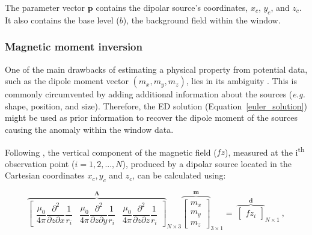     The parameter vector $\mathbf{p}$ contains the dipolar source's coordinates, $x_c$, $y_c$, and $z_c$. It also contains the base level ($b$), the background field within the window.
    
\subsubsection{Magnetic moment inversion}

    One of the main drawbacks of estimating a physical property from potential data, such as the dipole moment vector $(m_x, m_y, m_z)$, lies in its ambiguity \citep{Blakely1996}. This is commonly circumvented by adding additional information about the sources (\textit{e.g.} shape, position, and size). Therefore, the ED solution (Equation~\ref{euler_solution}) might be used as prior information to recover the dipole moment of the sources causing the anomaly within the window data.
    
     Following \citet{Oliveira2015Estimation}, the vertical component of the magnetic field ($fz$), measured at the i\textsuperscript{th} observation point ($i=1, 2, ..., N$), produced by a dipolar source located in the Cartesian coordinates $x_c, y_c$ and $z_c$, can be calculated using:

     \begin{equation}
    \label{eq_dipole_bz}
    {\overbrace{\begin{bmatrix}
    \dfrac{\mu_0}{4\pi} \dfrac{\partial^2}{\partial z \partial x} \dfrac{1}{r_i}
    & \dfrac{\mu_0}{4\pi} \dfrac{\partial^2}{\partial z \partial y} \dfrac{1}{r_i}
    & \dfrac{\mu_0}{4\pi} \dfrac{\partial^2}{\partial z \partial z} \dfrac{1}{r_i}
    \end{bmatrix}}^{\mathbf{A}}}_{N \times 3}
    {\overbrace{{\begin{bmatrix}
    m_x \\ m_y \\ m_z
    \end{bmatrix}}}^{\mathbf{m}}}_{3 \times 1}
    =
    ~{\overbrace{\begin{bmatrix}
    fz_i
    \end{bmatrix}}^{\mathbf{d}}}_{N \times 1}
    \ ,
    \end{equation}

